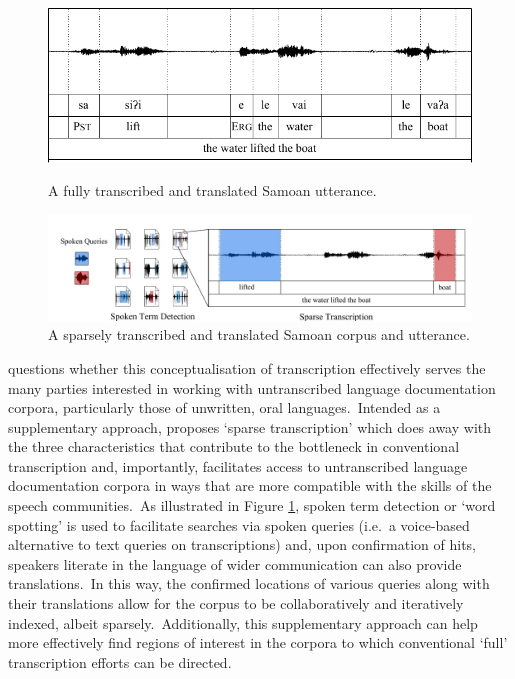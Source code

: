 \documentclass[main.tex]{subfiles}
\begin{document}
\begin{figure}[t]
  \centering
  \includegraphics[width=0.75\linewidth]{figures/intro-conventional-transcription}
  \caption{A fully transcribed and translated Samoan utterance.}
\label{fig:how-lift-boat-tf}

  \includegraphics[width=1.0\linewidth]{figures/intro-sparse-transcription}
  \caption{A sparsely transcribed and translated Samoan corpus and utterance.}
  \label{fig:how-lift-boat-sparse}
\end{figure}



\textcite{bird-2020-sparse} questions whether this conceptualisation of transcription effectively serves the many parties interested in working with untranscribed language documentation corpora, particularly those of unwritten, oral languages.~Intended as a supplementary approach, \textcite{bird-2020-sparse} proposes `sparse transcription' which does away with the three characteristics that contribute to the bottleneck in conventional transcription and, importantly, facilitates access to untranscribed language documentation corpora in ways that are more compatible with the skills of the speech communities.~As illustrated in Figure \ref{fig:how-lift-boat-sparse}, spoken term detection or `word spotting' is used to facilitate searches via spoken queries (i.e.~a voice-based alternative to text queries on transcriptions) and, upon confirmation of hits, speakers literate in the language of wider communication can also provide translations.~In this way, the confirmed locations of various queries along with their translations allow for the corpus to be collaboratively and iteratively indexed, albeit sparsely.~Additionally, this supplementary approach can help more effectively find regions of interest in the corpora to which conventional `full' transcription efforts can be directed. 
\end{document}

